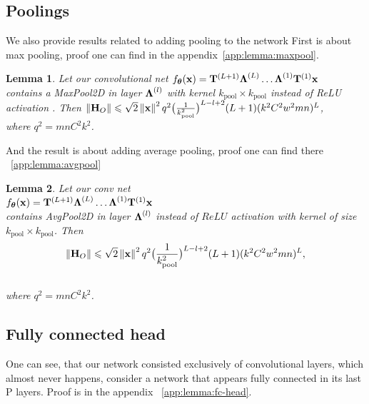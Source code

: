 \documentclass[conference]{IEEEtran}
\newtheorem{lemma}{Lemma}
\begin{document}
\subsection{Poolings}
We also provide results related to adding pooling to the network
First is about max pooling, proof one can find in the appendix~\ref{app:lemma:maxpool}.
\begin{lemma}\label{lemma:maxpool}
    Let our convolutional net 
    $f_{\boldsymbol{\theta}}(\mathbf{x}) = \mathbf{T}^{(L+1)}\boldsymbol{\Lambda}^{(L)}\dots \boldsymbol{\Lambda}^{(1)}\mathbf{T}^{(1)}\mathbf{x}$ \\
   contains a MaxPool2D in layer $\boldsymbol{\Lambda}^{(l)}$ with kernel $k_{\mathrm{pool}} \times k_{\mathrm{pool}}$ instead of ReLU activation . Then $\left\|\mathbf{H}_O\right\| \leqslant \sqrt{2}\left\|\mathbf{x}\right\|^2q^2\big(\frac{1}{k_{\mathrm{pool}}^2}\big)^{L-l+2}(L+1)(k^2C^2w^2mn)^{L}$, \\
where $q^2 = mnC^2k^2$.
\end{lemma}

And the result is about adding average pooling, proof one can find there ~\ref{app:lemma:avgpool}
\begin{lemma}\label{lemma:avgpool}
    Let our conv net \\
    $f_{\boldsymbol{\theta}}(\mathbf{x}) = \mathbf{T}^{(L+1)}\boldsymbol{\Lambda}^{(L)}\dots \boldsymbol{\Lambda}^{(1)}\mathbf{T}^{(1)}\mathbf{x}$ \\
    contains AvgPool2D in layer $\boldsymbol{\Lambda}^{(l)}$ instead of  $ReLU$ activation with kernel of size $k_{\mathrm{pool}} \times k_{\mathrm{pool}}$. Then \\
    \[\left\|\mathbf{H}_O\right\| \leqslant \sqrt{2}\left\|\mathbf{x}\right\|^2q^2\big(\frac{1}{k_{\mathrm{pool}}^2}\big)^{L-l+2}(L+1)(k^2C^2w^2mn)^{L},\] \\
where $q^2 = mnC^2k^2$.
\end{lemma}

\subsection{Fully connected head}
One can see, that our network consisted exclusively of convolutional layers, which almost never happens, consider a network that appears fully connected in its last P layers. Proof is in the appendix ~\ref{app:lemma:fc-head}.
\end{document}
